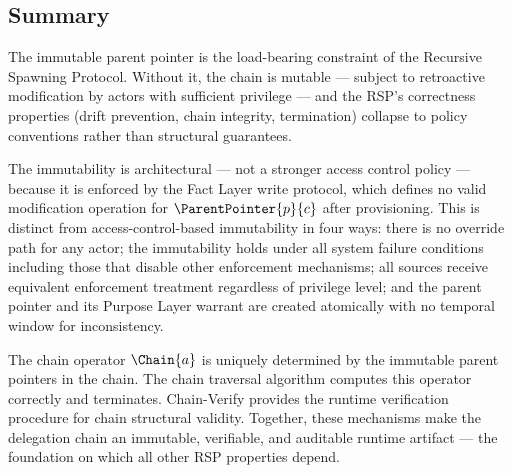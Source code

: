 \subsection{Summary}
\label{sec:immutability-summary}

The immutable parent pointer is the load-bearing constraint of the Recursive Spawning Protocol. Without it, the chain is mutable --- subject to retroactive modification by actors with sufficient privilege --- and the RSP's correctness properties (drift prevention, chain integrity, termination) collapse to policy conventions rather than structural guarantees.

The immutability is architectural --- not a stronger access control policy --- because it is enforced by the Fact Layer write protocol, which defines no valid modification operation for $\ParentPointer{p}{c}$ after provisioning. This is distinct from access-control-based immutability in four ways: there is no override path for any actor; the immutability holds under all system failure conditions including those that disable other enforcement mechanisms; all sources receive equivalent enforcement treatment regardless of privilege level; and the parent pointer and its Purpose Layer warrant are created atomically with no temporal window for inconsistency.

The chain operator $\Chain{a}$ is uniquely determined by the immutable parent pointers in the chain. The chain traversal algorithm computes this operator correctly and terminates. Chain-Verify provides the runtime verification procedure for chain structural validity. Together, these mechanisms make the delegation chain an immutable, verifiable, and auditable runtime artifact --- the foundation on which all other RSP properties depend.

